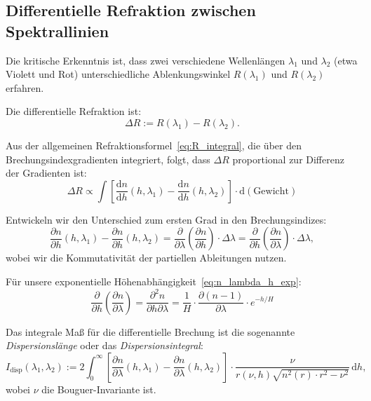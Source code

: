 \documentclass[12pt,a4paper]{article}
\begin{document}
\subsection{Differentielle Refraktion zwischen Spektrallinien}
\label{subsec:diff_refraktion}

Die kritische Erkenntnis ist, dass zwei verschiedene Wellenlängen
$\lambda_1$ und $\lambda_2$ (etwa Violett und Rot) unterschiedliche
Ablenkungswinkel $R(\lambda_1)$ und $R(\lambda_2)$ erfahren.

Die differentielle Refraktion ist:
\begin{equation}
	\Delta R := R(\lambda_1) - R(\lambda_2).
	\label{eq:diff_R}
\end{equation}

Aus der allgemeinen Refraktionsformel~\eqref{eq:R_integral},
die über den Brechungsindexgradienten integriert, folgt, dass $\Delta R$
proportional zur Differenz der Gradienten ist:
\begin{equation}
	\Delta R \propto \int \left[\frac{\mathrm{d}n}{\mathrm{d}h}(h, \lambda_1) 
	- \frac{\mathrm{d}n}{\mathrm{d}h}(h, \lambda_2)\right] \cdot \mathrm{d}(\mathrm{Gewicht})
	\label{eq:delta_R_integral}
\end{equation}

Entwickeln wir den Unterschied zum ersten Grad in den Brechungsindizes:
\begin{equation}
	\frac{\partial n}{\partial h}(h, \lambda_1) - \frac{\partial n}{\partial h}(h, \lambda_2)
	= \frac{\partial}{\partial \lambda}\left(\frac{\partial n}{\partial h}\right) \cdot \Delta \lambda
	= \frac{\partial}{\partial h}\left(\frac{\partial n}{\partial \lambda}\right) \cdot \Delta \lambda,
	\label{eq:diff_grad}
\end{equation}
wobei wir die Kommutativität der partiellen Ableitungen nutzen.

Für unsere exponentielle Höhenabhängigkeit~\eqref{eq:n_lambda_h_exp}:
\begin{equation}
	\frac{\partial}{\partial h}\left(\frac{\partial n}{\partial \lambda}\right) 
	= \frac{\partial^2 n}{\partial h \partial \lambda}
	= \frac{1}{H} \cdot \frac{\partial(n-1)}{\partial \lambda} \cdot e^{-h/H}
	\label{eq:mixed_partial}
\end{equation}

Das integrale Maß für die differentielle Brechung ist die sogenannte
\emph{Dispersionslänge} oder das \emph{Dispersionsintegral}:
\begin{equation}
	I_{\mathrm{disp}}(\lambda_1, \lambda_2) := 2 \int_0^\infty 
	\left[\frac{\partial n}{\partial \lambda}(h, \lambda_1) 
	- \frac{\partial n}{\partial \lambda}(h, \lambda_2)\right] \cdot 
	\frac{\nu}{r(\nu,h) \sqrt{n^2(r) \cdot r^2 - \nu^2}} \, \mathrm{d}h,
	\label{eq:disp_integral}
\end{equation}
wobei $\nu$ die Bouguer-Invariante ist.
\end{document}
